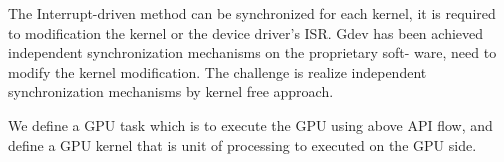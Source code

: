 The Interrupt-driven method can be synchronized for each kernel, it is required to modification the kernel or the device driver's ISR.
Gdev has been achieved independent synchronization mechanisms on the proprietary soft- ware, need to modify the kernel modification.
The challenge is realize independent synchronization mechanisms by kernel free approach.

We define a GPU task which is to execute the GPU using above API flow,
and define a GPU kernel that is unit of processing to executed on the GPU side.
